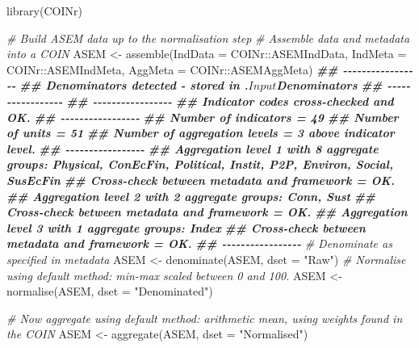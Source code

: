 \documentclass[
]{book}
\newenvironment{Shaded}{\begin{snugshade}}{\end{snugshade}}
\newcommand{\AttributeTok}[1]{\textcolor[rgb]{0.77,0.63,0.00}{#1}}
\newcommand{\CommentTok}[1]{\textcolor[rgb]{0.56,0.35,0.01}{\textit{#1}}}
\newcommand{\DocumentationTok}[1]{\textcolor[rgb]{0.56,0.35,0.01}{\textbf{\textit{#1}}}}
\newcommand{\FunctionTok}[1]{\textcolor[rgb]{0.00,0.00,0.00}{#1}}
\newcommand{\NormalTok}[1]{#1}
\newcommand{\OtherTok}[1]{\textcolor[rgb]{0.56,0.35,0.01}{#1}}
\newcommand{\SpecialCharTok}[1]{\textcolor[rgb]{0.00,0.00,0.00}{#1}}
\newcommand{\StringTok}[1]{\textcolor[rgb]{0.31,0.60,0.02}{#1}}
\begin{document}
\begin{Shaded}
\begin{Highlighting}[]
\FunctionTok{library}\NormalTok{(COINr)}

\CommentTok{\# Build ASEM data up to the normalisation step}
\CommentTok{\# Assemble data and metadata into a COIN}
\NormalTok{ASEM }\OtherTok{\textless{}{-}} \FunctionTok{assemble}\NormalTok{(}\AttributeTok{IndData =}\NormalTok{ COINr}\SpecialCharTok{::}\NormalTok{ASEMIndData, }\AttributeTok{IndMeta =}\NormalTok{ COINr}\SpecialCharTok{::}\NormalTok{ASEMIndMeta, }\AttributeTok{AggMeta =}\NormalTok{ COINr}\SpecialCharTok{::}\NormalTok{ASEMAggMeta)}
\DocumentationTok{\#\# {-}{-}{-}{-}{-}{-}{-}{-}{-}{-}{-}{-}{-}{-}{-}{-}{-}}
\DocumentationTok{\#\# Denominators detected {-} stored in .$Input$Denominators}
\DocumentationTok{\#\# {-}{-}{-}{-}{-}{-}{-}{-}{-}{-}{-}{-}{-}{-}{-}{-}{-}}
\DocumentationTok{\#\# {-}{-}{-}{-}{-}{-}{-}{-}{-}{-}{-}{-}{-}{-}{-}{-}{-}}
\DocumentationTok{\#\# Indicator codes cross{-}checked and OK.}
\DocumentationTok{\#\# {-}{-}{-}{-}{-}{-}{-}{-}{-}{-}{-}{-}{-}{-}{-}{-}{-}}
\DocumentationTok{\#\# Number of indicators = 49}
\DocumentationTok{\#\# Number of units = 51}
\DocumentationTok{\#\# Number of aggregation levels = 3 above indicator level.}
\DocumentationTok{\#\# {-}{-}{-}{-}{-}{-}{-}{-}{-}{-}{-}{-}{-}{-}{-}{-}{-}}
\DocumentationTok{\#\# Aggregation level 1 with 8 aggregate groups: Physical, ConEcFin, Political, Instit, P2P, Environ, Social, SusEcFin}
\DocumentationTok{\#\# Cross{-}check between metadata and framework = OK.}
\DocumentationTok{\#\# Aggregation level 2 with 2 aggregate groups: Conn, Sust}
\DocumentationTok{\#\# Cross{-}check between metadata and framework = OK.}
\DocumentationTok{\#\# Aggregation level 3 with 1 aggregate groups: Index}
\DocumentationTok{\#\# Cross{-}check between metadata and framework = OK.}
\DocumentationTok{\#\# {-}{-}{-}{-}{-}{-}{-}{-}{-}{-}{-}{-}{-}{-}{-}{-}{-}}
\CommentTok{\# Denominate as specified in metadata}
\NormalTok{ASEM }\OtherTok{\textless{}{-}} \FunctionTok{denominate}\NormalTok{(ASEM, }\AttributeTok{dset =} \StringTok{"Raw"}\NormalTok{)}
\CommentTok{\# Normalise using default method: min{-}max scaled between 0 and 100.}
\NormalTok{ASEM }\OtherTok{\textless{}{-}} \FunctionTok{normalise}\NormalTok{(ASEM, }\AttributeTok{dset =} \StringTok{"Denominated"}\NormalTok{)}

\CommentTok{\# Now aggregate using default method: arithmetic mean, using weights found in the COIN}
\NormalTok{ASEM }\OtherTok{\textless{}{-}} \FunctionTok{aggregate}\NormalTok{(ASEM, }\AttributeTok{dset =} \StringTok{"Normalised"}\NormalTok{)}


\end{Highlighting}
\end{Shaded}
\end{document}

